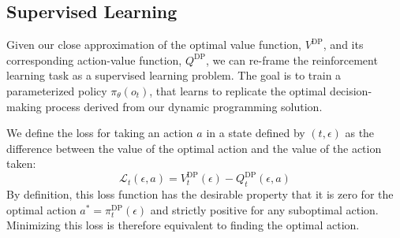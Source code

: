



\subsection{Supervised Learning}

Given our close approximation of the optimal value function, $V^\text{DP}$, and its corresponding action-value function, $Q^\text{DP}$, we can re-frame the reinforcement learning task as a supervised learning problem. The goal is to train a parameterized policy $\pi_\theta(o_t)$, that learns to replicate the optimal decision-making process derived from our dynamic programming solution.

We define the loss for taking an action $a$ in a state defined by $(t, \epsilon)$ as the difference between the value of the optimal action and the value of the action taken:
$$
\mathcal{L}_t(\epsilon, a) = V^\text{DP}_t(\epsilon) - Q_t^\text{DP}(\epsilon, a)
$$
By definition, this loss function has the desirable property that it is zero for the optimal action $a^* = \pi^\text{DP}_t(\epsilon)$ and strictly positive for any suboptimal action. Minimizing this loss is therefore equivalent to finding the optimal action.

